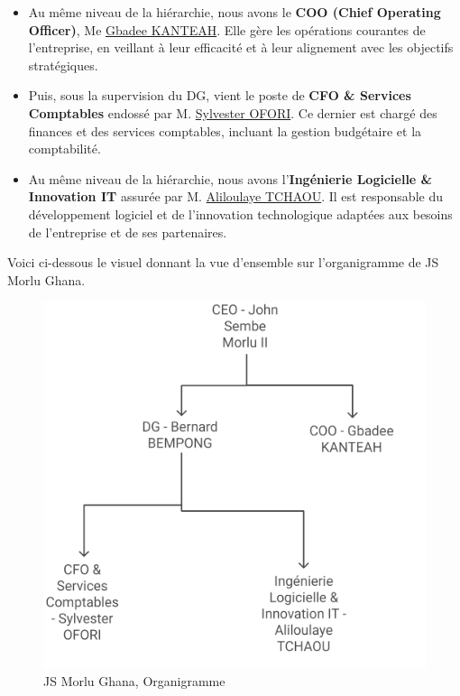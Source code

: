 {\begin{itemize}
    \item Au même niveau de la hiérarchie, nous avons le \textbf{COO (Chief Operating Officer)}, Me \href{https://jsmorlu.com.gh/our-team/gbadee-kanteah/}{Gbadee KANTEAH}. Elle gère les opérations courantes de l’entreprise, en veillant à leur efficacité et à leur alignement avec les objectifs stratégiques.

    \item Puis, sous la supervision du DG, vient le poste de \textbf{CFO \& Services Comptables} endossé par M. \href{https://jsmorlu.com.gh/our-team/sylvester-ofori/}{Sylvester OFORI}. Ce dernier est chargé des finances et des services comptables, incluant la gestion budgétaire et la comptabilité.

    \item Au même niveau de la hiérarchie, nous avons l'\textbf{Ingénierie Logicielle \& Innovation IT} assurée par M. \href{https://jsmorlu.com.gh/our-team/aliloulaye-tchaou/}{Aliloulaye TCHAOU}. Il est responsable du développement logiciel et de l'innovation technologique adaptées aux besoins de l’entreprise et de ses partenaires.
\end{itemize}

\vspace{0.5cm}

Voici ci-dessous le visuel donnant la vue d'ensemble sur l'organigramme de JS Morlu Ghana. \\

\begin{figure}[H]
\begin{center}
\includegraphics[width=15cm]{assets/presentation/2_organigramme.png}
\end{center}
\caption{JS Morlu Ghana, Organigramme }
\end{figure}


}

